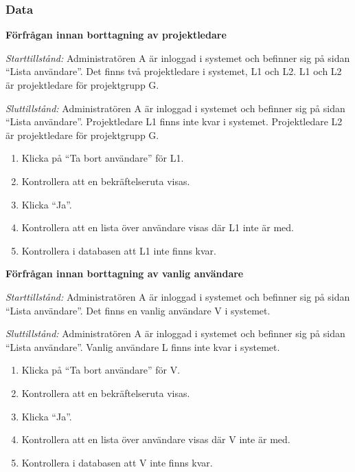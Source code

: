 \documentclass[a4paper]{article}
\begin{document}
\subsubsection{Data}
\begin{FT}
\item \textbf{Förfrågan innan borttagning av projektledare}

\emph{Starttillstånd:} Administratören A är inloggad i systemet och befinner sig på sidan ``Lista användare''. Det finns två projektledare i systemet, L1 och L2. L1 och L2 är projektledare för projektgrupp G.

\emph{Sluttillstånd:} Administratören A är inloggad i systemet och befinner sig på sidan ``Lista användare''. Projektledare L1 finns inte kvar i systemet. Projektledare L2 är projektledare för projektgrupp G.

\begin{enumerate}
\item Klicka på ``Ta bort användare'' för L1.
\item Kontrollera att en bekräftelseruta visas.
\item Klicka ``Ja''.
\item Kontrollera att en lista över användare visas där L1 inte är med.
\item Kontrollera i databasen att L1 inte finns kvar.
\end{enumerate}

\item \textbf{Förfrågan innan borttagning av vanlig användare}

\emph{Starttillstånd:} Administratören A är inloggad i systemet och befinner sig på sidan ``Lista användare''. Det finns en vanlig användare V i systemet.

\emph{Sluttillstånd:} Administratören A är inloggad i systemet och befinner sig på sidan ``Lista användare''. Vanlig användare L finns inte kvar i systemet.

\begin{enumerate}
\item Klicka på ``Ta bort användare'' för V.
\item Kontrollera att en bekräftelseruta visas.
\item Klicka ``Ja''.
\item Kontrollera att en lista över användare visas där V inte är med.
\item Kontrollera i databasen att V inte finns kvar.
\end{enumerate}


\end{FT}
\end{document}
